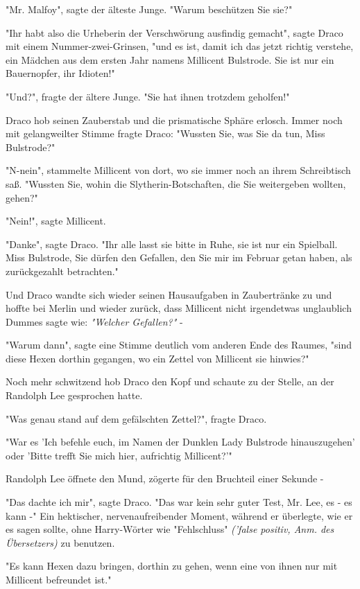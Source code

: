{"Mr. Malfoy", sagte der älteste Junge. "Warum beschützen Sie sie?"

"Ihr habt also die Urheberin der Verschwörung ausfindig gemacht", sagte Draco mit einem Nummer-zwei-Grinsen, "und es ist, damit ich das jetzt richtig verstehe, ein Mädchen aus dem ersten Jahr namens Millicent Bulstrode. Sie ist nur ein Bauernopfer, ihr Idioten!"

"Und?", fragte der ältere Junge. "Sie hat ihnen trotzdem geholfen!"

Draco hob seinen Zauberstab und die prismatische Sphäre erlosch. Immer noch mit gelangweilter Stimme fragte Draco: "Wussten Sie, was Sie da tun, Miss Bulstrode?"

"N-nein", stammelte Millicent von dort, wo sie immer noch an ihrem Schreibtisch saß. "Wussten Sie, wohin die Slytherin-Botschaften, die Sie weitergeben wollten, gehen?"

"Nein!", sagte Millicent.

"Danke", sagte Draco. "Ihr alle lasst sie bitte in Ruhe, sie ist nur ein Spielball. Miss Bulstrode, Sie dürfen den Gefallen, den Sie mir im Februar getan haben, als zurückgezahlt betrachten."

Und Draco wandte sich wieder seinen Hausaufgaben in Zaubertränke zu und hoffte bei Merlin und wieder zurück, dass Millicent nicht irgendetwas unglaublich Dummes sagte wie: \emph{"Welcher Gefallen?"} -

"Warum dann", sagte eine Stimme deutlich vom anderen Ende des Raumes, "sind diese Hexen dorthin gegangen, wo ein Zettel von Millicent sie hinwies?"

Noch mehr schwitzend hob Draco den Kopf und schaute zu der Stelle, an der Randolph Lee gesprochen hatte.

"Was genau stand auf dem gefälschten Zettel?", fragte Draco.

"War es 'Ich befehle euch, im Namen der Dunklen Lady Bulstrode hinauszugehen' oder 'Bitte trefft Sie mich hier, aufrichtig Millicent?'"

Randolph Lee öffnete den Mund, zögerte für den Bruchteil einer Sekunde -

"Das dachte ich mir", sagte Draco. "Das war kein sehr guter Test, Mr. Lee, es - es kann -" Ein hektischer, nervenaufreibender Moment, während er überlegte, wie er es sagen sollte, ohne Harry-Wörter wie "Fehlschluss" \emph{('false positiv, Anm. des Übersetzers)} zu benutzen.

"Es kann Hexen dazu bringen, dorthin zu gehen, wenn eine von ihnen nur mit Millicent befreundet ist."

}
